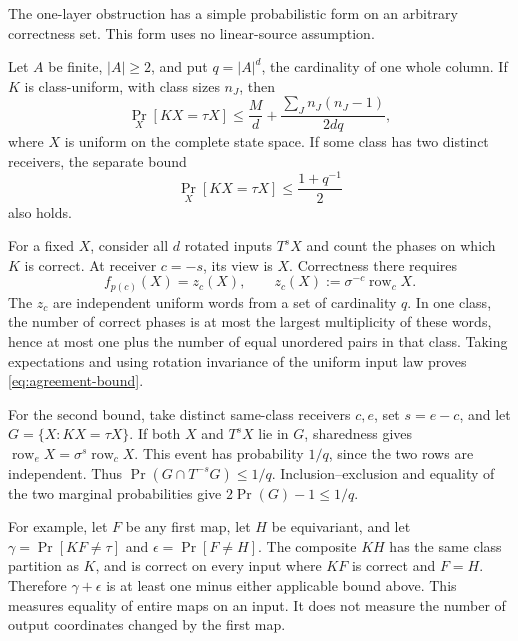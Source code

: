 The one-layer obstruction has a simple probabilistic form on an arbitrary
correctness set.  This form uses no linear-source assumption.

\begin{proposition}\label{prop:agreement}
Let $A$ be finite, $|A|\ge2$, and put $q=|A|^d$, the cardinality of one
whole column.  If $K$ is class-uniform, with class sizes $n_J$, then
\begin{equation}\label{eq:agreement-bound}
 \Pr_X[KX=\tau X]
 \le \frac{M}{d}+
       \frac{\sum_J n_J(n_J-1)}{2dq},
\end{equation}
where $X$ is uniform on the complete state space.  If some class has two
distinct receivers, the separate bound
\begin{equation}\label{eq:agreement-pair}
 \Pr_X[KX=\tau X]\le\frac{1+q^{-1}}2
\end{equation}
also holds.
\end{proposition}
\begin{outline}
For a fixed $X$, consider all $d$ rotated inputs $T^sX$ and count the
phases on which $K$ is correct.  At receiver $c=-s$, its view is $X$.
Correctness there requires
\[
 f_{p(c)}(X)=z_c(X),\qquad
 z_c(X):=\sigma^{-c}\operatorname{row}_cX.
\]
The $z_c$ are independent uniform words from a set of cardinality $q$.
In one class, the number of correct phases is at most the largest
multiplicity of these words, hence at most one plus the number of equal
unordered pairs in that class.  Taking expectations and using rotation
invariance of the uniform input law proves \cref{eq:agreement-bound}.

For the second bound, take distinct same-class receivers $c,e$, set
$s=e-c$, and let $G=\{X:KX=\tau X\}$.  If both $X$ and $T^sX$ lie in
$G$, sharedness gives
$\operatorname{row}_eX=\sigma^s\operatorname{row}_cX$.
This event has probability $1/q$, since the two rows are independent.
Thus $\Pr(G\cap T^{-s}G)\le1/q$.  Inclusion--exclusion and equality of
the two marginal probabilities give $2\Pr(G)-1\le1/q$.
\end{outline}

For example, let $F$ be any first map, let $H$ be equivariant, and let
$\gamma=\Pr[KF\ne\tau]$ and $\epsilon=\Pr[F\ne H]$.  The composite
$KH$ has the same class partition as $K$, and is correct on every input
where $KF$ is correct and $F=H$.  Therefore
$\gamma+\epsilon$ is at least one minus either applicable bound above.
This measures equality of entire maps on an input.  It does not measure
the number of output coordinates changed by the first map.

